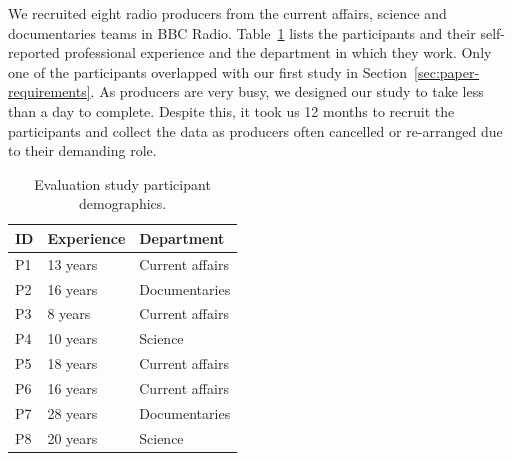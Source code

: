We recruited eight radio producers from the current affairs, science and documentaries teams in BBC Radio.
Table~\ref{tab:participants} lists the participants and their self-reported professional experience and the department in
which they work.
Only one of the
participants overlapped with our first study in Section~\ref{sec:paper-requirements}.  As producers are very busy, we
designed our study to take less than a day to complete. Despite this, it took us 12 months to recruit the participants
and collect the data as producers often cancelled or re-arranged due to their demanding role.

\begin{table}[h]
  \centering
  \begin{tabular}{l l l}
      \hline
      \textbf{ID} & \textbf{Experience} & \textbf{Department} \\ %
      \hline
      P1 & 13 years & Current affairs \\%
      P2 & 16 years & Documentaries   \\%
      P3 & 8 years & Current affairs \\%
      P4 & 10 years & Science         \\%
      P5 & 18 years & Current affairs \\%
      P6 & 16 years & Current affairs \\%
      P7 & 28 years & Documentaries   \\%
      P8 & 20 years & Science         \\%
      \hline
  \end{tabular}
  \caption{Evaluation study participant demographics.}
  \label{tab:participants}
\end{table}


